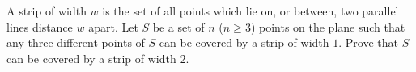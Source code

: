A strip of width $w$ is the set of all points which lie on, or between, two parallel lines distance $w$ apart. Let $S$ be a set of $n$ ($n \ge 3$) points on the plane such that any three different points of $S$ can be covered by a strip of width $1$.
Prove that $S$ can be covered by a strip of width $2$.